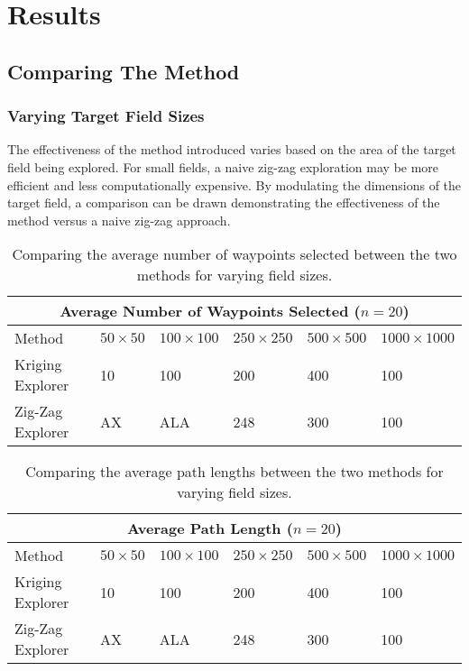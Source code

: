 \chapter{Results}

\section{Comparing The Method}

\subsection{Varying Target Field Sizes}
The effectiveness of the method introduced varies based on the area of the target field being explored. For small fields, a naive zig-zag exploration may be more efficient and less computationally expensive. By modulating the dimensions of the target field, a comparison can be drawn demonstrating the effectiveness of the method versus a naive zig-zag approach.

\begin{table}
\centering
	\begin{tabular}{ |p{3cm}||p{1.5cm}|p{1.5cm}|p{1.5cm}|p{1.5cm}|p{2cm}|  }
		\hline
		\multicolumn{6}{|c|}{Average Number of Waypoints Selected ($n=20$)} \\
		\hline
		Method & $50 \times 50$ & $100 \times 100$ & $250 \times 250$ & $500 \times 500$ & $1000 \times 1000$ \\
		\hline
		Kriging Explorer   	& 10 & 100 & 200 & 400 & 100 \\
		Zig-Zag Explorer	& AX & ALA & 248 & 300 & 100 \\
		\hline
	\end{tabular}
	\caption{Comparing the average number of waypoints selected between the two methods for varying field sizes.}
    \label{tab:path_wps}
\end{table}

\begin{table}
\centering
	\begin{tabular}{ |p{3cm}||p{1.5cm}|p{1.5cm}|p{1.5cm}|p{1.5cm}|p{2cm}|  }
		\hline
		\multicolumn{6}{|c|}{Average Path Length ($n=20$)} \\
		\hline
		Method & $50 \times 50$ & $100 \times 100$ & $250 \times 250$ & $500 \times 500$ & $1000 \times 1000$ \\
		\hline
		Kriging Explorer   	& 10 & 100 & 200 & 400 & 100 \\
		Zig-Zag Explorer	& AX & ALA & 248 & 300 & 100 \\
		\hline
	\end{tabular}
	\caption{Comparing the average path lengths between the two methods for varying field sizes.}
    \label{tab:path_lengths}
\end{table}

